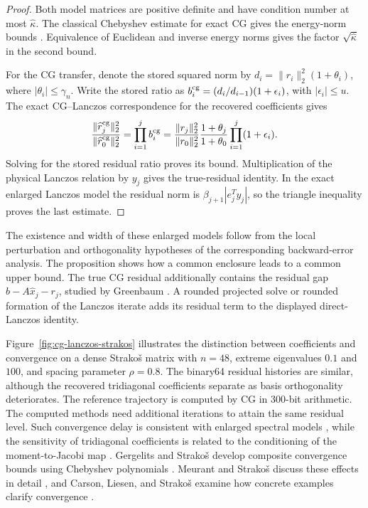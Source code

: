 \documentclass[11pt]{article}
\theoremstyle{definition}
\begin{document}
\begin{proof}
Both model matrices are positive definite and have condition number at
most $\widehat\kappa$.  The classical Chebyshev estimate for exact CG
gives the energy-norm bounds \cite[Sec.~6.11.3]{Saad2003}.
Equivalence of Euclidean and inverse energy norms gives the factor
$\sqrt{\widehat\kappa}$ in the second bound.

For the CG transfer, denote the stored squared norm by
$d_i=\|r_i\|_2^2(1+\theta_i)$, where $|\theta_i|\le\gamma_n$.
Write the stored ratio as
$b_i^{\rm cg}=(d_i/d_{i-1})(1+\epsilon_i)$, with $|\epsilon_i|\le u$.
The exact CG--Lanczos correspondence for the recovered coefficients gives
\[
 \frac{\|\widehat r_j^{\rm cg}\|_2^2}
      {\|\widehat r_0^{\rm cg}\|_2^2}
 =\prod_{i=1}^j b_i^{\rm cg}
 =\frac{\|r_j\|_2^2}{\|r_0\|_2^2}
   \frac{1+\theta_j}{1+\theta_0}
   \prod_{i=1}^j(1+\epsilon_i).
\]
Solving for the stored residual ratio proves its bound.
Multiplication of the physical Lanczos relation by $y_j$ gives the
true-residual identity.  In the exact enlarged Lanczos model the residual
norm is $\beta_{j+1}|e_j^Ty_j|$, so the triangle inequality proves the
last estimate.
\end{proof}

The existence and width of these enlarged models follow from the local
perturbation and orthogonality hypotheses of the corresponding
backward-error analysis.  The proposition shows how a common enclosure
leads to a common upper bound.  The true CG residual additionally
contains the residual gap $b-A\widehat x_j-r_j$, studied by
Greenbaum \cite{Greenbaum1997Residual}.  A rounded projected solve or
rounded formation of the Lanczos iterate adds its residual term to the
displayed direct-Lanczos identity.

Figure~\ref{fig:cg-lanczos-strakos} illustrates the distinction between
coefficients and convergence on a dense Strako\v{s} matrix with $n=48$,
extreme eigenvalues $0.1$ and $100$, and spacing parameter $\rho=0.8$.
The binary64 residual histories are similar, although the recovered
tridiagonal coefficients separate as basis orthogonality deteriorates.
The reference trajectory is computed by CG in 300-bit arithmetic.
The computed methods need additional iterations to attain the same
residual level.  Such convergence delay is consistent with enlarged
spectral models \cite{GreenbaumStrakos1992,Strakos1991,Notay1993},
while the sensitivity of tridiagonal coefficients is related to the
conditioning of the moment-to-Jacobi map
\cite{Knizhnerman1996,ChenTrogdon2024}.
Gergelits and Strako\v{s} develop composite convergence bounds using
Chebyshev polynomials \cite{GergelitsStrakos2014}.
Meurant and Strako\v{s} discuss these effects in detail
\cite{Meurant2006,MeurantStrakos2006}, and Carson, Liesen, and
Strako\v{s} examine how concrete examples clarify convergence
\cite{CarsonLiesenStrakos2024}.
\end{document}
